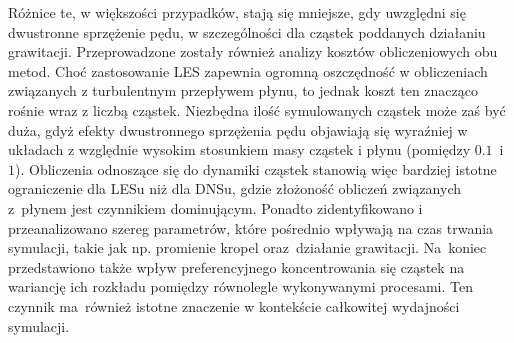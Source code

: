 \documentclass{pracamgren}
\begin{document}
{Różnice te, w większości przypadków, stają się mniejsze, gdy uwzględni się dwustronne sprzężenie pędu, w szczególności dla cząstek poddanych działaniu grawitacji.
\newline \indent
Przeprowadzone zostały również analizy kosztów obliczeniowych obu metod.
Choć zastosowanie LES zapewnia ogromną oszczędność w obliczeniach związanych z turbulentnym przepływem płynu, to jednak koszt ten znacząco rośnie wraz z liczbą cząstek.
Niezbędna ilość symulowanych cząstek może zaś być duża, gdyż efekty dwustronnego sprzężenia pędu objawiają się wyraźniej w układach z względnie wysokim stosunkiem masy cząstek i płynu (pomiędzy $0.1$~i~$1$).
Obliczenia odnoszące się do dynamiki cząstek stanowią więc bardziej istotne ograniczenie dla LESu niż dla DNSu, gdzie złożoność obliczeń związanych z~płynem jest czynnikiem dominującym.
Ponadto zidentyfikowano i przeanalizowano szereg parametrów, które pośrednio wpływają na czas trwania symulacji, takie jak np. promienie kropel oraz~działanie grawitacji.
Na~koniec przedstawiono także wpływ preferencyjnego koncentrowania się cząstek na wariancję ich rozkładu pomiędzy równolegle wykonywanymi procesami.
Ten czynnik ma~również istotne znaczenie w kontekście całkowitej wydajności symulacji.
}
\end{document}
